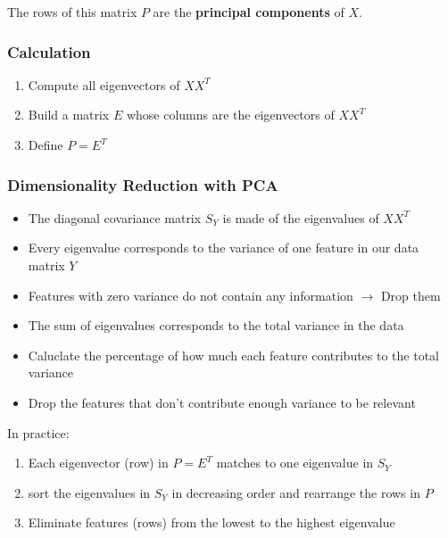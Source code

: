 \documentclass[11pt]{article}
\begin{document}
The rows of this matrix $P$ are the \textbf{principal components} of $X$.

\subsubsection{Calculation}

\begin{enumerate}
    \item Compute all eigenvectors of $XX^T$
    \item Build a matrix $E$ whose columns are the eigenvectors of $XX^T$
    \item Define $P = E^T$
\end{enumerate}

\subsubsection{Dimensionality Reduction with PCA}
\begin{itemize}
    \item The diagonal covariance matrix $S_Y$ is made of the eigenvalues of $XX^T$
    \item Every eigenvalue corresponds to the variance of one feature in our data matrix $Y$
    \item Features with zero variance do not contain any information $\rightarrow$ Drop them
    \item The sum of eigenvalues corresponds to the total variance in the data
    \item Caluclate the percentage of how much each feature contributes to the total variance
    \item Drop the features that don't contribute enough variance to be relevant
\end{itemize}

In practice:

\begin{enumerate}
    \item Each eigenvector (row) in $P = E^T$ matches to one eigenvalue in $S_Y$
    \item sort the eigenvalues in $S_Y$ in decreasing order and rearrange the rows in $P$
    \item Eliminate features (rows) from the lowest to the highest eigenvalue
\end{enumerate}
\end{document}
